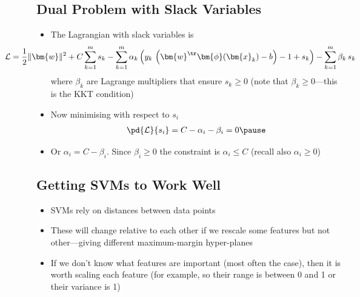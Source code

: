 \begin{slide}
\section[-2]{Dual Problem with Slack Variables}
  
\begin{PauseHighLight}
  \begin{itemize}
  \item The Lagrangian with slack variables is
    \begin{align*}
      \hspace{-2cm}\mathcal{L} = \frac{1}{2} \|\bm{w}\|^2
      + C \sum_{k=1}^m s_k
      - \sum_{k=1}^m \alpha_k \left(\strut
      y_k\,\left(\bm{w}^{\tr} \bm{\phi}(\bm{x}_k) -  b\right) - 1 + s_k
      \right) - \sum_{k=1}^m \beta_k \, s_k
    \end{align*}
    where $\beta_k$ are Lagrange multipliers that ensure $s_k\geq0$ (note
    that $\beta_k\geq0$---this is the KKT condition)\pause
  \item Now minimising with respect to $s_i$
    \begin{align*}
      \pd{\mathcal{L}}{s_i} = C - \alpha_i - \beta_i =0\pause
    \end{align*}
  \item Or $\alpha_i = C -\beta_i$.  Since $\beta_i \geq 0$ the
    constraint is $\alpha_i \leq C$\pause{} (recall also $\alpha_i\geq0$)\pauseb
  \end{itemize}
\end{PauseHighLight}

\end{slide}




\Outline %

\begin{slide}
\section[-2]{Getting SVMs to Work Well}

\pb
\begin{itemize}
\item SVMs rely on distances between data points\pauseh
\item These will change relative to each other if we rescale some
  features but not other---giving different maximum-margin
  hyper-planes\pauseh
  \begin{center}
    \pause
  \end{center}
\item If we don't know what features are important (most often the
  case), then it is worth scaling each feature (for example, so their
  range is between 0 and 1 or their variance is 1)\pause
\end{itemize}

\end{slide}


